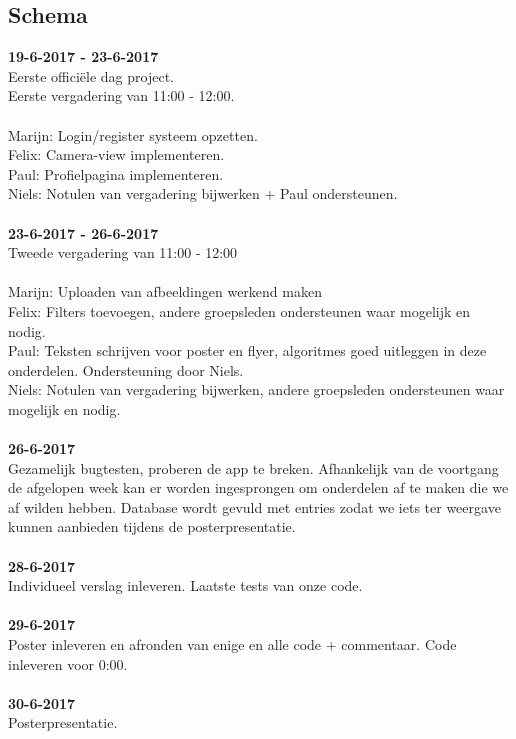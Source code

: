 \documentclass{uva-inf-article}
\begin{document}
\subsection{Schema}
\textbf{19-6-2017 - 23-6-2017}\\
Eerste offici\"ele dag project.\\
Eerste vergadering van 11:00 - 12:00.\\\\
Marijn: \space\space Login/register systeem opzetten.\\
Felix: \space\space\space\space Camera-view implementeren.\\
Paul: \space\space\space\space Profielpagina implementeren.\\
Niels: \space\space\space\space Notulen van vergadering bijwerken + Paul ondersteunen.\\
\\
\noindent
\textbf{23-6-2017 - 26-6-2017}\\
Tweede vergadering van 11:00 - 12:00\\\\
Marijn: \space\space Uploaden van afbeeldingen werkend maken\\
Felix: \space\space\space\space Filters toevoegen, andere groepsleden ondersteunen waar mogelijk en nodig.\\
Paul: \space\space\space\space Teksten schrijven voor poster en flyer, algoritmes goed uitleggen in deze onderdelen. Ondersteuning door Niels.\\
Niels: \space\space\space\space Notulen van vergadering bijwerken, andere groepsleden ondersteunen waar mogelijk en nodig.\\
\\
\noindent
\textbf{26-6-2017}\\
Gezamelijk bugtesten, proberen de app te breken. Afhankelijk van de voortgang de afgelopen week kan er worden ingesprongen om onderdelen af te maken die we af wilden hebben. Database wordt gevuld met entries zodat we iets ter weergave kunnen aanbieden tijdens de posterpresentatie.
\\\\
\noindent
\textbf{28-6-2017}\\
Individueel verslag inleveren. Laatste tests van onze code.
\\\\
\noindent
\textbf{29-6-2017}\\
Poster inleveren en afronden van enige en alle code + commentaar. Code inleveren voor 0:00.
\\\\
\noindent
\textbf{30-6-2017}\\
Posterpresentatie.


\end{document}
